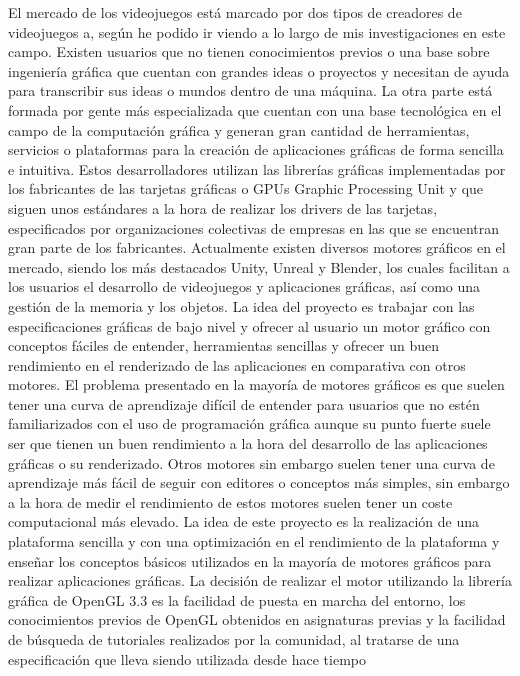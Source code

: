 \documentclass[a4paper, 17pt]{book}
\begin{document}
El mercado de los videojuegos está marcado por dos tipos de creadores de videojuegos a, según he podido ir 
viendo a lo largo de mis investigaciones en este campo. Existen usuarios que no tienen conocimientos 
previos o una base sobre ingeniería gráfica que cuentan con grandes ideas o proyectos y necesitan de
ayuda para transcribir sus ideas o mundos dentro de una máquina. 
\bigbreak
La otra parte está formada por gente más especializada que cuentan con una base tecnológica en el campo 
de la computación gráfica y generan gran cantidad de herramientas, servicios o plataformas para la 
creación de aplicaciones gráficas de forma sencilla e intuitiva. 
\bigbreak
Estos desarrolladores utilizan las librerías gráficas implementadas por los fabricantes de las tarjetas
gráficas o GPUs Graphic Processing Unit y que siguen unos estándares a la hora de realizar los drivers
de las tarjetas, especificados por organizaciones colectivas de empresas en las que se encuentran
gran parte de los fabricantes. 
\bigbreak
Actualmente existen diversos motores gráficos en el mercado, siendo los más destacados Unity, Unreal y Blender,
los cuales facilitan a los usuarios el desarrollo de videojuegos y aplicaciones gráficas, así como una gestión
de la memoria y los objetos.
\bigbreak
La idea del proyecto es trabajar con las especificaciones gráficas de bajo nivel y ofrecer al usuario un motor
gráfico con conceptos fáciles de entender, herramientas sencillas y ofrecer un buen rendimiento en el
renderizado de las aplicaciones en comparativa con otros motores. 
\bigbreak
El problema presentado en la mayoría de motores gráficos es que suelen tener una curva de aprendizaje difícil
de entender para usuarios que no estén familiarizados con el uso de programación gráfica aunque su punto fuerte
suele ser que tienen un buen rendimiento a la hora del desarrollo de las aplicaciones gráficas o su renderizado.
\bigbreak
Otros motores sin embargo suelen tener una curva de aprendizaje más fácil de seguir con editores o conceptos más simples,
sin embargo a la hora de medir el rendimiento de estos motores suelen tener un coste computacional más elevado.
La idea de este proyecto es la realización de una plataforma sencilla y con una optimización en el rendimiento de la
plataforma y enseñar los conceptos básicos utilizados en la mayoría de motores gráficos para realizar aplicaciones gráficas.
\bigbreak
La decisión de realizar el motor utilizando la librería gráfica de OpenGL 3.3 es la facilidad de puesta en marcha del
entorno, los conocimientos previos de OpenGL obtenidos en asignaturas previas y la facilidad de búsqueda de tutoriales
realizados por la comunidad, al tratarse de una especificación que lleva siendo utilizada desde hace tiempo
\end{document}
